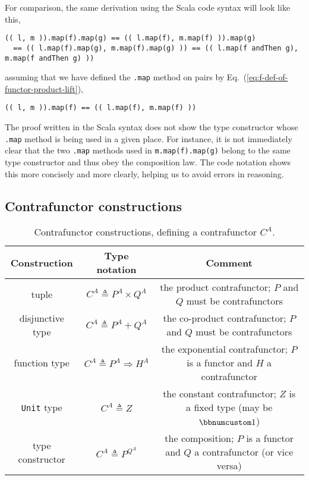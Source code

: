 For comparison, the same derivation using the Scala code syntax will
look like this,
\begin{lstlisting}
(( l, m )).map(f).map(g) == (( l.map(f), m.map(f) )).map(g)
  == (( l.map(f).map(g), m.map(f).map(g) )) == (( l.map(f andThen g), m.map(f andThen g) )) 
\end{lstlisting}
assuming that we have defined the \lstinline!.map! method on pairs
by Eq.~(\ref{eq:f-def-of-functor-product-lift}),
\begin{lstlisting}
(( l, m )).map(f) == (( l.map(f), m.map(f) ))
\end{lstlisting}
The proof written in the Scala syntax does not show the type constructor
whose \lstinline!.map! method is being used in a given place. For
instance, it is not immediately clear that the two \lstinline!.map!
methods used in \lstinline!m.map(f).map(g)! belong to the same type
constructor and thus obey the composition law. The code notation shows
this more concisely and more clearly, helping us to avoid errors in
reasoning.

\subsection{Contrafunctor constructions}

\begin{table}
\begin{centering}
\begin{tabular}{|c|c|c|}
\hline 
\textbf{Construction} & \textbf{Type notation} & \textbf{Comment}\tabularnewline
\hline 
\hline 
{\footnotesize{}tuple} & {\footnotesize{}$C^{A}\triangleq P^{A}\times Q^{A}$} & {\footnotesize{}the product contrafunctor; $P$ and $Q$ must be contrafunctors}\tabularnewline
\hline 
{\footnotesize{}disjunctive type} & {\footnotesize{}$C^{A}\triangleq P^{A}+Q^{A}$} & {\footnotesize{}the co-product contrafunctor; $P$ and $Q$ must be
contrafunctors}\tabularnewline
\hline 
{\footnotesize{}function type} & {\footnotesize{}$C^{A}\triangleq P^{A}\Rightarrow H^{A}$} & {\footnotesize{}the exponential contrafunctor; $P$ is a functor and
$H$ a contrafunctor}\tabularnewline
\hline 
{\footnotesize{}}\lstinline!Unit!{\footnotesize{} type} & {\footnotesize{}$C^{A}\triangleq Z$} & {\footnotesize{}the constant contrafunctor; $Z$ is a fixed type (may
be $\bbnum 1$)}\tabularnewline
\hline 
{\footnotesize{}type constructor} & {\footnotesize{}$C^{A}\triangleq P^{Q^{A}}$} & {\footnotesize{}the composition; $P$ is a functor and $Q$ a contrafunctor
(or vice versa)}\tabularnewline
\hline 
\end{tabular}
\par\end{centering}
\caption{Contrafunctor constructions, defining a contrafunctor $C^{A}$.\label{tab:f-Contrafunctor-constructions}}
\end{table}


